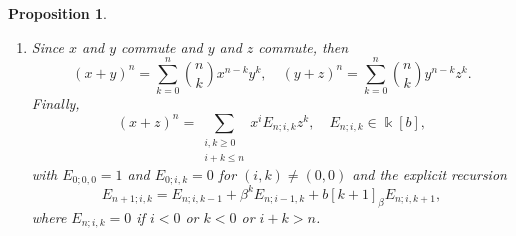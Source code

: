 \documentclass{amsart}
\newtheorem{proposition}[theorem]{Proposition}
\theoremstyle{definition}
\theoremstyle{remark}
\numberwithin{equation}{section}
\begin{document}
\begin{proposition}
\begin{enumerate}
\item[\rm (5)] Since $x$ and $y$ commute and $y$ and $z$ commute, then
\[
(x+y)^n=\sum_{k=0}^{n}\binom{n}{k}x^{n-k}y^k,\quad (y+z)^n=\sum_{k=0}^{n}\binom{n}{k}y^{n-k}z^k.
\]
Finally, 
\begin{equation}\label{Edefconstbcomm2iv}
(x+z)^n=\sum_{\substack{i,k\ge 0\\ i+k\le n}} x^{i}E_{n;i,k}z^{k}, \quad E_{n;i,k}\in\Bbbk[b],
\end{equation}
with $E_{0;0,0}=1$ and $E_{0;i,k}=0$ for $(i,k)\neq(0,0)$ and the explicit recursion
\begin{equation}\label{Erecconstbcomm2iv}
E_{n+1;i,k} = E_{n;i,k-1} +\beta^{k}E_{n;i-1,k}+b[k+1]_{\beta} E_{n;i,k+1},
\end{equation}
where $E_{n;i,k}=0$ if $i<0$ or $k<0$ or $i+k>n$.
\end{enumerate}
\end{proposition}
\end{document}
